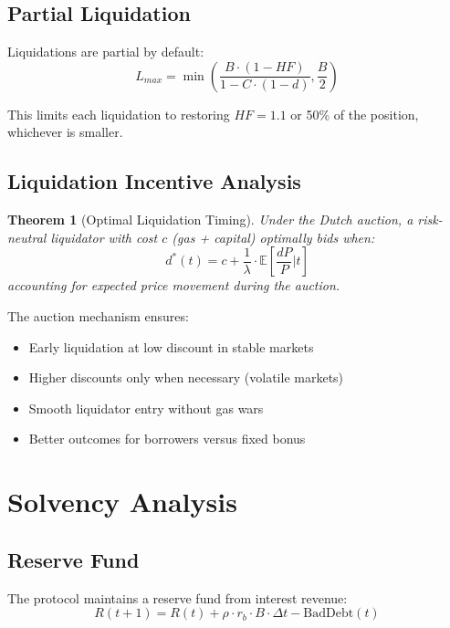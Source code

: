 \documentclass[11pt,a4paper]{article}
\newtheorem{theorem}{Theorem}
\begin{document}
\subsection{Partial Liquidation}

Liquidations are partial by default:
\begin{equation}
    L_{max} = \min\left(\frac{B \cdot (1 - HF)}{1 - C \cdot (1 - d)}, \frac{B}{2}\right)
\end{equation}

This limits each liquidation to restoring $HF = 1.1$ or 50\% of the position, whichever is smaller.

\subsection{Liquidation Incentive Analysis}

\begin{theorem}[Optimal Liquidation Timing]
Under the Dutch auction, a risk-neutral liquidator with cost $c$ (gas + capital) optimally bids when:
\begin{equation}
    d^*(t) = c + \frac{1}{\lambda} \cdot \mathbb{E}\left[\frac{dP}{P} \Big| t\right]
\end{equation}
accounting for expected price movement during the auction.
\end{theorem}

The auction mechanism ensures:
\begin{itemize}
    \item Early liquidation at low discount in stable markets
    \item Higher discounts only when necessary (volatile markets)
    \item Smooth liquidator entry without gas wars
    \item Better outcomes for borrowers versus fixed bonus
\end{itemize}

\section{Solvency Analysis}

\subsection{Reserve Fund}

The protocol maintains a reserve fund from interest revenue:
\begin{equation}
    R(t+1) = R(t) + \rho \cdot r_b \cdot B \cdot \Delta t - \text{BadDebt}(t)
\end{equation}
\end{document}
